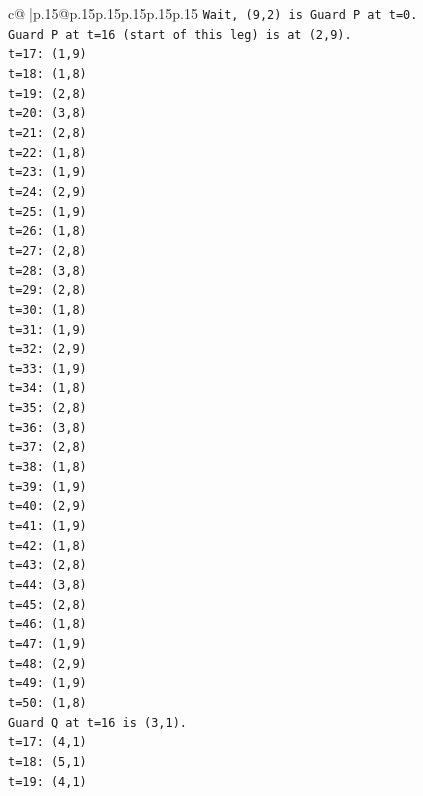 \documentclass{article}
\begin{document}
{\begin{supertabular}{c@{$\;$}|p{.15\linewidth}@{}p{.15\linewidth}p{.15\linewidth}p{.15\linewidth}p{.15\linewidth}p{.15\linewidth}}
{{{\texttt{Wait, (9,2) is Guard P at t=0.} \\
\texttt{Guard P at t=16 (start of this leg) is at (2,9).} \\
\texttt{t=17: (1,9)} \\
\texttt{t=18: (1,8)} \\
\texttt{t=19: (2,8)} \\
\texttt{t=20: (3,8)} \\
\texttt{t=21: (2,8)} \\
\texttt{t=22: (1,8)} \\
\texttt{t=23: (1,9)} \\
\texttt{t=24: (2,9)} \\
\texttt{t=25: (1,9)} \\
\texttt{t=26: (1,8)} \\
\texttt{t=27: (2,8)} \\
\texttt{t=28: (3,8)} \\
\texttt{t=29: (2,8)} \\
\texttt{t=30: (1,8)} \\
\texttt{t=31: (1,9)} \\
\texttt{t=32: (2,9)} \\
\texttt{t=33: (1,9)} \\
\texttt{t=34: (1,8)} \\
\texttt{t=35: (2,8)} \\
\texttt{t=36: (3,8)} \\
\texttt{t=37: (2,8)} \\
\texttt{t=38: (1,8)} \\
\texttt{t=39: (1,9)} \\
\texttt{t=40: (2,9)} \\
\texttt{t=41: (1,9)} \\
\texttt{t=42: (1,8)} \\
\texttt{t=43: (2,8)} \\
\texttt{t=44: (3,8)} \\
\texttt{t=45: (2,8)} \\
\texttt{t=46: (1,8)} \\
\texttt{t=47: (1,9)} \\
\texttt{t=48: (2,9)} \\
\texttt{t=49: (1,9)} \\
\texttt{t=50: (1,8)} \\
\texttt{Guard Q at t=16 is (3,1).} \\
\texttt{t=17: (4,1)} \\
\texttt{t=18: (5,1)} \\
\texttt{t=19: (4,1)} \\
}}}
\end{supertabular}}
\end{document}

